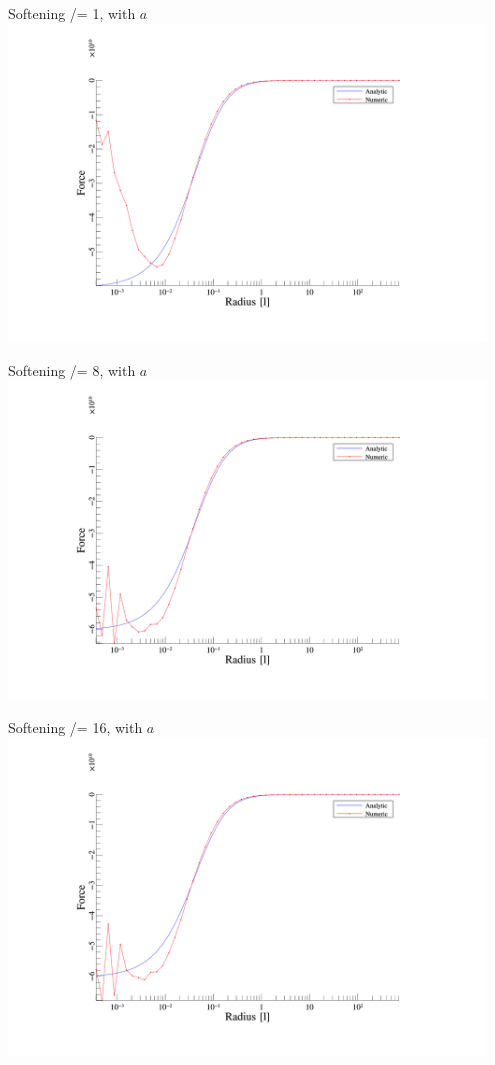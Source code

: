 \begin{frame}{Softening /= 1, with $a$}
	\includegraphics[width=0.95\textwidth]{figures/plots/forces_a_1.png}
\end{frame}

\begin{frame}{Softening /= 8, with $a$}
	\includegraphics[width=0.95\textwidth]{figures/plots/forces_a_8.png}
\end{frame}

\begin{frame}{Softening /= 16, with $a$}
	\includegraphics[width=0.95\textwidth]{figures/plots/forces_a_16.png}
\end{frame}

